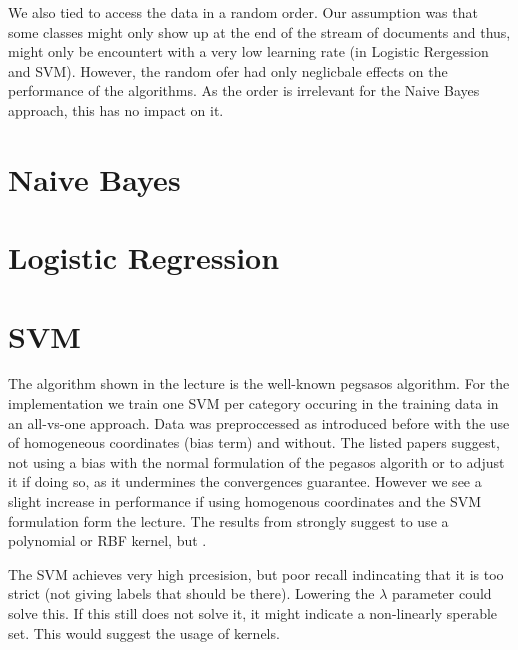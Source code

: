 \documentclass{article}
\begin{document}
We also tied to access the data in a random order. Our assumption was that some classes might only show up at the end of the stream of documents and thus, might only be encountert with a very low learning rate (in Logistic Rergession and SVM).
However, the random ofer had only neglicbale effects on the performance of the algorithms. As the order is irrelevant for the Naive Bayes approach, this has no impact on it.

\section*{Naive Bayes}
\lipsum[1-4] %

\section*{Logistic Regression}
\lipsum[1-4] %

\section*{SVM}
The algorithm shown in the lecture is the well-known pegsasos algorithm\cite{shalev-shwartz_pegasos:_2011,shalev-shwartz_pegasos:_????}. For the implementation we train one SVM per category occuring in the training data in an all-vs-one approach.
Data was preproccessed as introduced before with the use of homogeneous coordinates (bias term) and without. The listed papers suggest, not using a bias with the normal formulation of the pegasos algorith or to adjust it if doing so, as it undermines the convergences guarantee. However we see a slight increase in performance if using homogenous coordinates and the SVM formulation form the lecture.
The results from \cite{joachims_text_1998} strongly suggest to use a polynomial or RBF kernel, but .


The SVM achieves very high prcesision, but poor recall indincating that it is too strict (not giving labels that should be there). Lowering the $\lambda$ parameter could solve this. If this still does not solve it, it might indicate a non-linearly sperable set. This would suggest the usage of kernels.


\printbibliography
\end{document}
